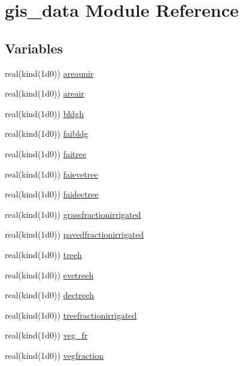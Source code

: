 \hypertarget{namespacegis__data}{}\section{gis\+\_\+data Module Reference}
\label{namespacegis__data}
\subsection*{Variables}
\begin{DoxyCompactItemize}
\item 
real(kind(1d0)) \hyperlink{namespacegis__data_aa03da52768d09c13ccfeb0d193f41b2e}{areaunir}
\item 
real(kind(1d0)) \hyperlink{namespacegis__data_ae687756bf9ebbc2a6b62812fa76ab008}{areair}
\item 
real(kind(1d0)) \hyperlink{namespacegis__data_a2a0cc85bf87fdf807e528acb5c7b0740}{bldgh}
\item 
real(kind(1d0)) \hyperlink{namespacegis__data_a23e18e9f568ef5a47ed3b37826c9f7f3}{faibldg}
\item 
real(kind(1d0)) \hyperlink{namespacegis__data_ae72d3a579ecf2a355591ca6eb2e69e7a}{faitree}
\item 
real(kind(1d0)) \hyperlink{namespacegis__data_a78a214dccb2ce0e8d532e514bd05927f}{faievetree}
\item 
real(kind(1d0)) \hyperlink{namespacegis__data_ae57a4a8a22280d3953006ba6e242c5be}{faidectree}
\item 
real(kind(1d0)) \hyperlink{namespacegis__data_afcf40b580d0a125cd6adbb7fd65be940}{grassfractionirrigated}
\item 
real(kind(1d0)) \hyperlink{namespacegis__data_a1eb73d51311f9f34a225b59c614c4829}{pavedfractionirrigated}
\item 
real(kind(1d0)) \hyperlink{namespacegis__data_a61372aae8e3ed0ee5389693466534169}{treeh}
\item 
real(kind(1d0)) \hyperlink{namespacegis__data_a2eab7550922ec226bac9160b71203e83}{evetreeh}
\item 
real(kind(1d0)) \hyperlink{namespacegis__data_a4f60c63599a3076e7b8ffabbcaa57405}{dectreeh}
\item 
real(kind(1d0)) \hyperlink{namespacegis__data_adf2d66b8c91265b1373f86153ba0a07c}{treefractionirrigated}
\item 
real(kind(1d0)) \hyperlink{namespacegis__data_a16985ccbad5040769f8cd039103c4f15}{veg\+\_\+fr}
\item 
real(kind(1d0)) \hyperlink{namespacegis__data_a092cc07d2d55535e1995ac1196dac36a}{vegfraction}

\end{DoxyCompactItemize}
